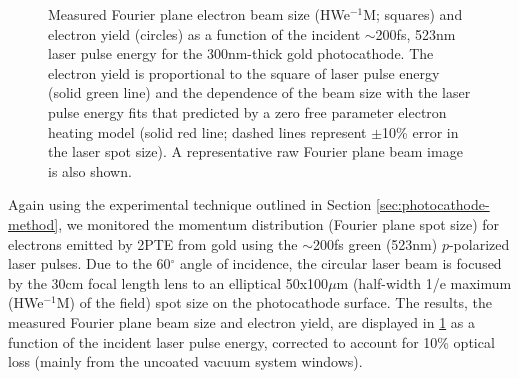 \begin{figure}
  \centering
  
  \caption[Measured Fourier plane electron beam size and yield vs incident laser pulse energy on gold photocathode]{
    Measured Fourier plane electron beam size (HWe$^{-1}$M; squares) and electron yield (circles) as a function of the incident $\sim$200fs, 523nm laser pulse energy for the 300nm-thick gold photocathode.
    The electron yield is proportional to the square of laser pulse energy (solid green line) and the dependence of the beam size with the laser pulse energy fits that predicted by a zero free parameter electron heating model (solid red line; dashed lines represent $\pm$10\% error in the laser spot size).
    A representative raw Fourier plane beam image is also shown.
  }
  \label{fig:gold-emission}
\end{figure}

Again using the experimental technique outlined in Section \ref{sec:photocathode-method}, we monitored the momentum distribution (Fourier plane spot size) for electrons emitted by 2PTE from gold using the $\sim$200fs green (523nm) $p$-polarized laser pulses.
Due to the 60$^{\circ}$ angle of incidence, the circular laser beam is focused by the 30cm focal length lens to an elliptical 50x100$\mu$m (half-width 1/e maximum (HWe$^{-1}$M) of the field) spot size on the photocathode surface.
The results, the measured Fourier plane beam size and electron yield, are displayed in \ref{fig:gold-emission} as a function of the incident laser pulse energy, corrected to account for 10\% optical loss (mainly from the uncoated vacuum system windows).

